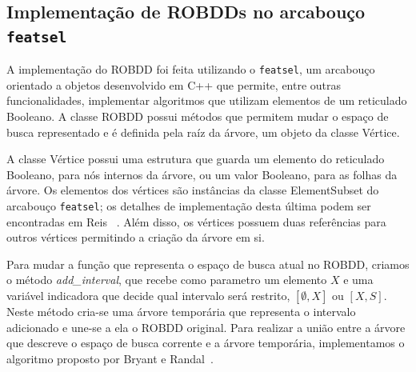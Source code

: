 \documentclass[12pt]{article}
\begin{document}
%
%
%
%
%


\subsection{Implementação de ROBDDs no arcabouço {\tt featsel} } \label{sec:atividades:ROBDD}
A implementação do ROBDD foi feita utilizando o {\tt featsel}, um arcabouço orientado a objetos desenvolvido em C++ que permite, entre outras funcionalidades, implementar algoritmos que utilizam elementos de um reticulado Booleano. A classe ROBDD possui métodos que permitem mudar o espaço de busca representado e é definida pela raíz da árvore, um objeto da classe Vértice.

A classe Vértice possui uma estrutura que guarda um elemento do reticulado Booleano, para nós internos da árvore, ou um valor Booleano, para as folhas da árvore. Os elementos dos vértices são instâncias da classe ElementSubset do arcabouço {\tt featsel}; os detalhes de implementação desta última podem ser encontradas em Reis ~\cite{msreis thesis}. Além disso, os vértices possuem duas referências para outros vértices permitindo a criação da árvore em si.

Para mudar a função que representa o espaço de busca atual no ROBDD, criamos o método \emph{add\_interval}, que recebe como parametro um elemento $X$ e uma variável indicadora que decide qual intervalo será restrito, $[\emptyset, X]$ ou $[X, S]$. Neste método cria-se uma árvore temporária que representa o intervalo adicionado e une-se a ela o ROBDD original. Para realizar a união entre a árvore que descreve o espaço de busca corrente e a árvore temporária, implementamos o algoritmo proposto por Bryant e Randal~\cite{bryant}.
\end{document}
